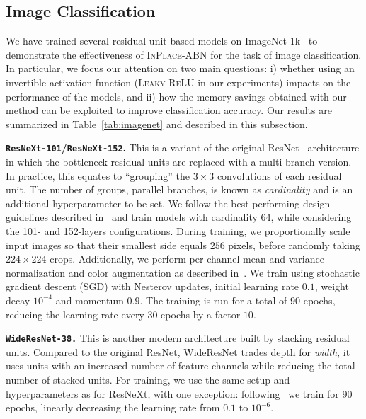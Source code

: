 \documentclass[10pt,twocolumn,letterpaper]{article}
\newcommand{\bnInplace}{\textsc{InPlace-ABN}\xspace}
\newcommand{\myparagraph}[1]{\vspace{5pt}\noindent\textbf{#1}}
\begin{document}
\subsection{Image Classification}\label{ssec:ExpClass}
We have trained several residual-unit-based models on ImageNet-1k~\cite{Rus+15} to demonstrate the effectiveness of \bnInplace for the task of image classification.
In particular, we focus our attention on two main questions: i) whether using an invertible activation function (\ie \textsc{Leaky ReLU} in our experiments) impacts on the performance of the models, and ii) how the memory savings obtained with our method can be exploited to improve classification accuracy.
Our results are summarized in Table~\ref{tab:imagenet} and described in this subsection.

\myparagraph{\texttt{ResNeXt-101}/\texttt{ResNeXt-152}.}
This is a variant of the original ResNet~\cite{He2015b} architecture in which the bottleneck residual units are replaced with a multi-branch version.
In practice, this equates to ``grouping'' the $3\times 3$ convolutions of each residual unit.
The number of groups, \ie parallel branches, is known as \textit{cardinality} and is an additional hyperparameter to be set.
We follow the best performing design guidelines described in~\cite{Xie2016} and train models with cardinality 64, while considering the 101- and 152-layers configurations.
During training, we proportionally scale input images so that their smallest side equals $256$ pixels, before randomly taking $224\times 224$ crops.
Additionally, we perform per-channel mean and variance normalization and color augmentation as described in~\cite{Xie2016}.
We train using stochastic gradient descent (SGD) with Nesterov updates, initial learning rate $0.1$, weight decay $10^{-4}$ and momentum $0.9$.
The training is run for a total of $90$ epochs, reducing the learning rate every $30$ epochs by a factor $10$.

\myparagraph{\texttt {WideResNet-38.}}
This is another modern architecture built by stacking residual units.
Compared to the original ResNet, WideResNet trades depth for \emph{width}, \ie it uses units with an increased number of feature channels while reducing the total number of stacked units.
For training, we use the same setup and hyperparameters as for ResNeXt, with one exception: following~\cite{Wu2016c} we train for $90$ epochs, linearly decreasing the learning rate from $0.1$ to $10^{-6}$. 
\end{document}
